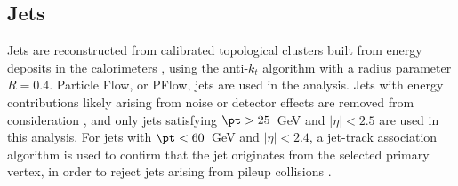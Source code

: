 

\subsection{Jets}
\label{subsec:jets}
Jets are reconstructed from calibrated topological clusters built from energy deposits in the calorimeters \cite{ATL-PHYS-PUB-2015-015}, using the anti-$k_t$ algorithm with a radius parameter $R=0.4$. Particle Flow, or PFlow, jets are used in the analysis. Jets with energy contributions likely arising from noise or detector effects are removed from consideration \cite{ATLAS-CONF-2015-029}, and only jets satisfying $\pt > 25$~GeV and $|\eta| < 2.5$ are used in this analysis.  For jets with $\pt < 60$~GeV and $|\eta| < 2.4$, a jet-track association algorithm is used to confirm that the jet originates from the selected primary vertex, in order to reject jets arising from pileup collisions \cite{PERF-2014-03}.

